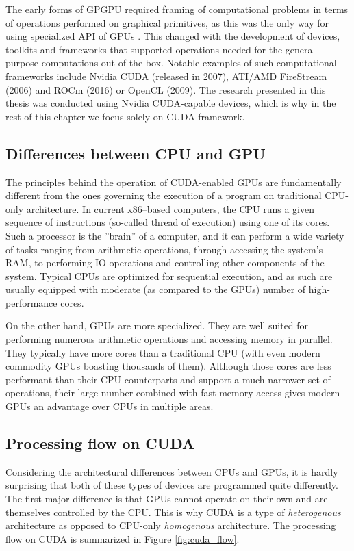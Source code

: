 The early forms of GPGPU required framing of computational problems in terms of
operations performed on graphical primitives, as this was the only way for
using specialized API of GPUs \cite{earlygpgpu,fastmatrixmultiplies}. This
changed with the development of devices, toolkits and frameworks that supported
operations needed for the general-purpose computations out of the box. Notable
examples of such computational frameworks include Nvidia CUDA \cite{CUDAguide,
  CUDAvsOpenCL, CUDAExperience} (released in 2007), ATI/AMD FireStream
\cite{firestream1,firestream2} (2006) and ROCm \cite{ROCm1,ROCm2,ROCm3} (2016)
or OpenCL \cite{CUDAvsOpenCL} (2009). The research presented in this thesis was
conducted using Nvidia CUDA-capable devices, which is why in the rest of this
chapter we focus solely on CUDA framework.

\subsection{Differences between CPU and GPU}
The principles behind the operation of CUDA-enabled GPUs are fundamentally
different from the ones governing the execution of a program on traditional
CPU-only architecture. In current x86--based computers, the CPU runs a given
sequence of instructions (so-called thread of execution) using one of its
cores. Such a processor is the ''brain'' of a computer, and it can perform a
wide variety of tasks ranging from arithmetic operations, through accessing the
system's RAM, to performing IO operations and controlling other components of
the system. Typical CPUs are optimized for sequential execution, and as such
are usually equipped with moderate (as compared to the GPUs) number of
high-performance cores.

On the other hand, GPUs are more specialized. They are well suited for
performing numerous arithmetic operations and accessing memory in parallel.
They typically have more cores than a traditional CPU (with even modern
commodity GPUs boasting thousands of them). Although those cores are less
performant than their CPU counterparts and support a much narrower set of
operations, their large number combined with fast memory access gives modern
GPUs an advantage over CPUs in multiple areas.

\subsection{Processing flow on CUDA}
Considering the architectural differences between CPUs and GPUs, it is hardly
surprising that both of these types of devices are programmed quite
differently. The first major difference is that GPUs cannot operate on their
own and are themselves controlled by the CPU. This is why CUDA is a type of
\emph{heterogenous} architecture as opposed to CPU-only \emph{homogenous}
architecture. The processing flow on CUDA is summarized in Figure
\ref{fig:cuda_flow}.

